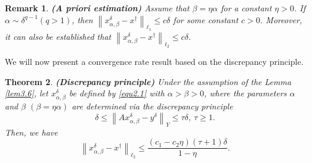 \documentclass[a4paper,12pt]{article}
\newtheorem{theorem}{Theorem}[section]
\newtheorem{remark}[theorem]{Remark}
\numberwithin{equation}{section}
\begin{document}
\begin{remark}\label{rem3.8}
    \textbf{(A priori estimation)} Assume that $\beta=\eta\alpha$ for a constant $\eta>0$. If $\alpha\sim\delta^{q-1}(q>1)$, then $\left\|x_{\alpha,\beta}^{\delta}-x^{\dagger}\right\|_{\ell_{1}}\leq c\delta$ for some constant $c>0$. Moreover, it can also be established that $\left\|x_{\alpha,\beta}^{\delta}-x^{\dagger}\right\|_{\ell_{2}}\leq c\delta$.
\end{remark}

\par We will now present a convergence rate result based on the discrepancy principle.

\begin{theorem}\label{the3.9}
    \textbf{(Discrepancy principle)} Under the assumption of the Lemma \ref{lem3.6}, let $x_{\alpha,\beta}^{\delta}$ be defined by \eqref{equ2.1} with $\alpha>\beta>0$, where the parameters $\alpha$ and $\beta$ $\left(\beta=\eta\alpha\right)$ are determined via the discrepancy principle
    \begin{equation*}
        \delta\leq\left\|Ax_{\alpha,\beta}^{\delta}-y^{\delta}\right\|_{Y}\leq\tau\delta,\ \tau\geq 1.
    \end{equation*}
    Then, we have
    \begin{equation*}
        \left\|x_{\alpha,\beta}^{\delta}-x^{\dagger}\right\|_{\ell_{2}}\leq \frac{\left(c_{1}-c_{2}\eta\right)\left(\tau+1\right)\delta}{1-\eta}.
    \end{equation*}
\end{theorem}
    
\end{document}

